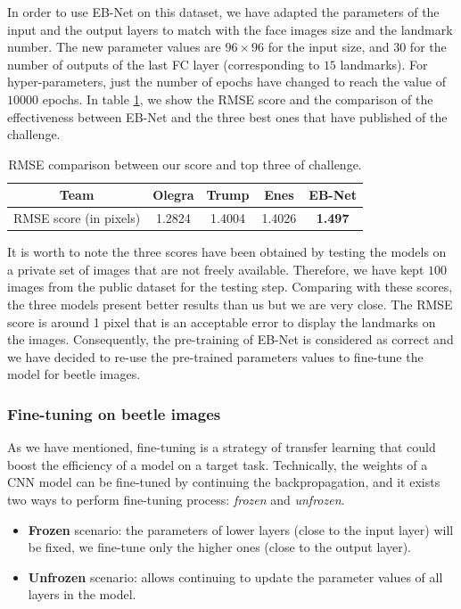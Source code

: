 \documentclass[review]{elsarticle}
\begin{document}
In order to use EB-Net on this dataset, we have adapted the parameters of the input and the output layers to match with the face images size and the landmark number. The new parameter values are $96 \times 96$ for the input size, and $30$ for the number of outputs of the last FC layer (corresponding to $15$ landmarks). For hyper-parameters, just the number of epochs have changed to reach the value of $10000$ epochs. In table \ref{tblRMSE_challenge}, we show the RMSE score and the comparison of the effectiveness between EB-Net and the three best ones that have published of the challenge.

\begin{table}[h!]
	\centering
	\begin{tabular}{ | c | c | c | c | c |}
	\hline
	Team & Olegra & Trump & Enes & EB-Net \\ \hline
	RMSE score (in pixels) & 1.2824 & 1.4004 & 1.4026 & \textbf{1.497} \\ \hline
\end{tabular}	
	\caption{RMSE comparison between our score and top three of challenge.}
	\label{tblRMSE_challenge}
\end{table}

It is worth to note the three scores have been obtained by testing the models on a private set of images that are not freely available. Therefore, we have kept $100$ images from the public dataset for the testing step. Comparing with these scores, the three models present better results than us but we are very close. The RMSE score is around 1 pixel that is an acceptable error to display the landmarks on the images. Consequently, the pre-training of EB-Net is considered as correct and we have decided to re-use the pre-trained parameters values to fine-tune the model for beetle images.

\subsubsection{Fine-tuning on beetle images}
As we have mentioned, fine-tuning is a strategy of transfer learning that could boost the efficiency of a model on a target task. Technically, the weights of a CNN model can be fine-tuned by continuing the backpropagation, and it exists two ways to perform fine-tuning process: \textit{frozen} and \textit{unfrozen}.
\begin{itemize}
	\item \textbf{Frozen} scenario: the parameters of lower layers (close to the input layer) will be fixed, we fine-tune only the higher ones (close to the output layer).
	\item \textbf{Unfrozen} scenario: allows continuing to update the parameter values of all layers in the model.
\end{itemize}
\end{document}
